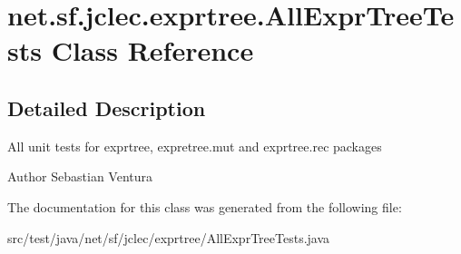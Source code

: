 \hypertarget{classnet_1_1sf_1_1jclec_1_1exprtree_1_1_all_expr_tree_tests}{\section{net.\-sf.\-jclec.\-exprtree.\-All\-Expr\-Tree\-Tests Class Reference}
\label{classnet_1_1sf_1_1jclec_1_1exprtree_1_1_all_expr_tree_tests}
}


\subsection{Detailed Description}
All unit tests for exprtree, expretree.\-mut and exprtree.\-rec packages

\begin{DoxyAuthor}{Author}
Sebastian Ventura 
\end{DoxyAuthor}


The documentation for this class was generated from the following file\-:\begin{DoxyCompactItemize}
\item 
src/test/java/net/sf/jclec/exprtree/All\-Expr\-Tree\-Tests.\-java\end{DoxyCompactItemize}
